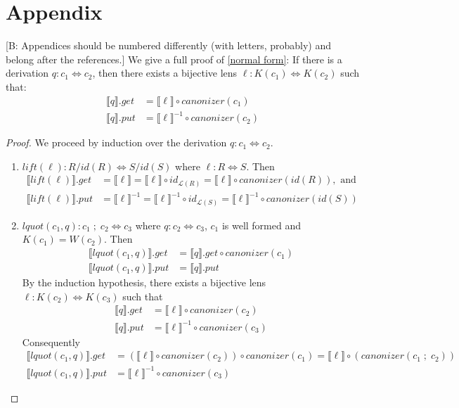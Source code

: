 \documentclass[acmsmall,review,anonymous]{acmart}
\newcommand{\FINISH}[3]{\ifdraft\textcolor{#1}{[#2: #3]}\fi}
\newcommand{\bcp}[1]{\FINISH{dkred}{B}{#1}}
\newcommand{\kw}[1]{\ensuremath{\mathit{#1}}}
\newcommand{\canonizer}{\ensuremath{\kw{canonizer}}}
\newcommand{\get}{\ensuremath{\kw{get}}}
\newcommand{\lput}{\ensuremath{\kw{put}}}
\begin{document}
\section{Appendix}
\bcp{Appendices should be numbered differently (with letters, probably) and
  belong after the references.}
%
We give a full proof of \cref{normal form}: If there is a derivation $q : c_1
\Leftrightarrow c_2$, then there exists a bijective lens $\ell : K(c_1)
\Leftrightarrow K(c_2)$ such that:
\begin{align*}
\llbracket q \rrbracket.\get &= \llbracket \ell \rrbracket\circ
\canonizer(c_1)\\
\llbracket q \rrbracket.\lput &= \llbracket \ell \rrbracket^{-1} \circ
\canonizer(c_2)
\end{align*}
\begin{proof}
We proceed by induction over the derivation $q : c_1 \Leftrightarrow c_2$.
\begin{enumerate}
  \item
  $\kw{lift}(\ell): R/\mathit{id}(R) \Leftrightarrow S/\mathit{id}(S)$ where
  $\ell : R \Leftrightarrow S$. Then
  \begin{align*}
\llbracket \kw{lift}(\ell) \rrbracket.\get &=  \llbracket \ell \rrbracket
= \llbracket \ell \rrbracket \circ id_{\mathcal{L}(R)} =
\llbracket \ell \rrbracket \circ \canonizer(\mathit{id}(R)), \text{ and }\\
\llbracket \kw{lift}(\ell) \rrbracket.\lput &= \llbracket \ell
\rrbracket^{-1} = \llbracket \ell \rrbracket^{-1} \circ id_{\mathcal{L}(S)} =
\llbracket \ell \rrbracket^{-1} \circ \canonizer(id(S))
\end{align*}
\item
$\kw{lquot}(c_1, q): c_1 \; ; \; c_2 \Leftrightarrow c_3$ where $q : c_2
\Leftrightarrow c_3$, $c_1$ is well formed and $K(c_1) = W(c_2)$. Then
\begin{align*}
\llbracket \kw{lquot}(c_1, q) \rrbracket.\get  &= \llbracket q
\rrbracket.\get \circ \canonizer(c_1)\\
\llbracket \kw{lquot}(c_1, q) \rrbracket.\lput &= \llbracket q \rrbracket.\lput
\end{align*}
By the induction hypothesis, there exists a bijective lens $\ell :
K(c_2) \Leftrightarrow K(c_3)$ such that
\begin{align*}
\llbracket q \rrbracket.\get &= \llbracket \ell \rrbracket \circ
\canonizer(c_2)\\
\llbracket q \rrbracket.\lput &= \llbracket \ell \rrbracket^{-1} \circ
\canonizer(c_3)
\end{align*}
Consequently
\begin{align*}
\llbracket \kw{lquot}(c_1, q)\rrbracket.\get  &= (\llbracket \ell \rrbracket \circ
\canonizer(c_2)) \circ \canonizer(c_1) = \llbracket \ell \rrbracket \circ
(\canonizer(c_1 \; ; \; c_2))\\
\llbracket \kw{lquot}(c_1, q) \rrbracket.\lput &= \llbracket \ell \rrbracket^{-1} \circ
\canonizer(c_3)
\end{align*}


\end{enumerate}
\end{proof}
\end{document}
